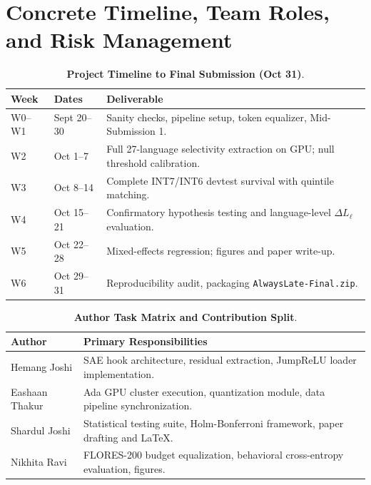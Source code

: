 \documentclass[11pt]{article}
\begin{document}
\section{Concrete Timeline, Team Roles, and Risk Management}

\begin{table}[!htbp]
\centering
\footnotesize
\begin{tabularx}{\columnwidth}{llX}
\toprule
\textbf{Week} & \textbf{Dates} & \textbf{Deliverable} \\
\midrule
W0--W1 & Sept 20--30 & Sanity checks, pipeline setup, token equalizer, Mid-Submission 1. \\
W2 & Oct 1--7 & Full 27-language selectivity extraction on GPU; null threshold calibration. \\
W3 & Oct 8--14 & Complete INT7/INT6 devtest survival with quintile matching. \\
W4 & Oct 15--21 & Confirmatory hypothesis testing and language-level $\Delta L_\ell$ evaluation. \\
W5 & Oct 22--28 & Mixed-effects regression; figures and paper write-up. \\
W6 & Oct 29--31 & Reproducibility audit, packaging \texttt{AlwaysLate-Final.zip}. \\
\bottomrule
\end{tabularx}
\caption{\textbf{Project Timeline to Final Submission (Oct 31)}.}
\label{tab:timeline}
\end{table}

\begin{table}[!htbp]
\centering
\footnotesize
\begin{tabularx}{\columnwidth}{lX}
\toprule
\textbf{Author} & \textbf{Primary Responsibilities} \\
\midrule
Hemang Joshi & SAE hook architecture, residual extraction, JumpReLU loader implementation. \\
Eashaan Thakur & Ada GPU cluster execution, quantization module, data pipeline synchronization. \\
Shardul Joshi & Statistical testing suite, Holm-Bonferroni framework, paper drafting and LaTeX. \\
Nikhita Ravi & FLORES-200 budget equalization, behavioral cross-entropy evaluation, figures. \\
\bottomrule
\end{tabularx}
\caption{\textbf{Author Task Matrix and Contribution Split}.}
\label{tab:authors}
\end{table}
\end{document}
